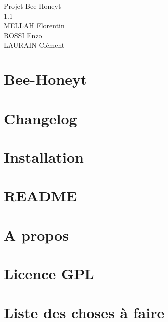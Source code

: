 \documentclass[twoside]{article}
\newcommand{\+}{\discretionary{\mbox{\scriptsize$\hookleftarrow$}}{}{}}
\begin{document}
\hypersetup{pageanchor=false,
             bookmarksnumbered=true,
             pdfencoding=unicode
            }
\begin{titlepage}
\vspace*{7cm}
\begin{center}%
{\LARGE Projet Bee-\/\+Honey\textquotesingle{}t \\[1ex]\large 1.\+1 }\\
\vspace*{1cm}
{\large MELLAH Florentin}\\
{\large ROSSI Enzo}\\
{\large LAURAIN Clément}\\
\end{center}
\end{titlepage}
\tableofcontents
{}
\hypersetup{pageanchor=true}

\section{Bee-\/\+Honey\textquotesingle{}t}
\label{index}\hypertarget{index}{}
\section{Changelog}
\label{page_changelog}

\section{Installation}
\label{page_install}

\section{R\+E\+A\+D\+ME}
\label{page__r_e_a_d_m_e}

\section{A propos}
\label{page_about}

\section{Licence G\+PL}
\label{page_licence}

\section{Liste des choses à faire}
\label{todo}

\end{document}
